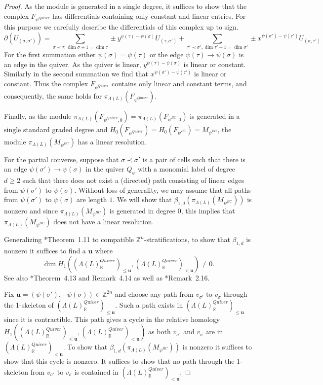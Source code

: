 \documentclass{amsart}
\newcommand{\ZZ}{\mathbb{Z}}
\newcommand{\RR}{\mathbb{R}}
\theoremstyle{remark}
\begin{document}
\begin{proof}
  As the module is generated in a single degree, it suffices to show that the complex $F_{\psi^{Quiver}}$ has differentials containing only constant and linear entries. For this purpose we carefully describe the differentials of this complex up to sign.
  \[\partial(U_{(\sigma,\sigma')}) = \sum_{\sigma\prec \tau,\dim \sigma + 1 = \dim \tau} \pm y^{\psi(\tau)-\psi(\sigma)}U_{(\tau,\sigma')} + \sum_{\tau'\prec \sigma', \dim \tau' + 1 = \dim \sigma'} \pm x^{\psi(\sigma')-\psi(\tau')}U_{(\sigma,\tau')}\]
  For the first summation either $\psi(\sigma)=\psi(\tau)$ or the edge $\psi(\tau)\rightarrow \psi(\sigma)$ is an edge in the quiver. As the quiver is linear, $y^{\psi(\tau)-\psi(\sigma)}$ is linear or constant. Similarly in the second summation we find that $x^{\psi(\sigma')-\psi(\tau')}$ is linear or constant. Thus the complex $F_{\psi^{Quiver}}$ contains only linear and constant terms, and consequently, the same holds for $\pi_{\Lambda(L)}(F_{\psi^{Quiver}})$.

  Finally, as the module $\pi_{\Lambda(L)}(F_{\psi^{Quiver},0})=\pi_{\Lambda(L)}(F_{\psi^{BC},0})$ is generated in a single standard graded degree and $H_0(F_{\psi^{Quiver}})=H_0(F_{\psi^{BC}})=M_{\psi^{BC}}$, the module $\pi_{\Lambda(L)}(M_{\psi^{BC}})$ has a linear resolution.

  For the partial converse, suppose that $\sigma\prec \sigma'$ is a pair of cells such that there is an edge $\psi(\sigma') \rightarrow \psi(\sigma)$ in the quiver $Q_\psi$ with a monomial label of degree $d\geq 2$ such that there does not exist a (directed) path consisting of linear edges from $\psi(\sigma')$ to $\psi(\sigma)$. Without loss of generality, we may assume that all paths from $\psi(\sigma')$ to $\psi(\sigma)$ are length $1$.
  We will show that $\beta_{1,d}(\pi_{\Lambda(L)}(M_{\psi^{BC}}))$ is nonzero and since $\pi_{\Lambda(L)}(M_{\psi^{BC}})$ is generated in degree $0$, this implies that $\pi_{\Lambda(L)}(M_{\psi^{BC}})$ does not have a linear resolution.

  Generalizing \cite{BS98}*{Theorem~1.11} to compatible $\ZZ^n$-stratifications, to show that $\beta_{1,d}$ is nonzero it suffices to find a $\bm{u}$ where
  \[\dim H_1\left((\Lambda(L)_{\RR}^{Quiver})_{\leq \bm{u}},(\Lambda(L)_{\RR}^{Quiver})_{<\bm{u}}\right)\neq 0.\]  
  See also \cite{FS24}*{Theorem~4.13 and Remark~4.14} as well as \cite{stratification-paper}*{Remark~2.16}.
  
  Fix $\bm{u}=(\psi(\sigma'),-\psi(\sigma))\in \ZZ^{2n}$
  and choose any path from $v_{\sigma'}$ to $v_{\sigma}$ through the 1-skeleton of $(\Lambda(L)_{\RR}^{Quiver})_{\leq \bm{u}}$.
  Such a path exists in $(\Lambda(L)_{\RR}^{Quiver})_{\leq \bm{u}}$ since it is contractible.
  This path gives a cycle in the relative homology $H_1\left((\Lambda(L)_{\RR}^{Quiver})_{\leq \bm{u}},(\Lambda(L)_{\RR}^{Quiver})_{< \bm{u}}\right)$
  as both $v_{\sigma'}$ and $v_{\sigma}$ are in $(\Lambda(L)_{\RR}^{Quiver})_{< \bm{u}}$.
  To show that $\beta_{1,d}(\pi_{\Lambda(L)}(M_{\psi^{BC}}))$ is nonzero it suffices to show that this cycle is nonzero.
  It suffices to show that no path through the 1-skeleton from $v_{\sigma'}$ to $v_{\sigma}$ is contained in $(\Lambda(L)_{\RR}^{Quiver})_{<\bm{u}}$.


\end{proof}
\end{document}
